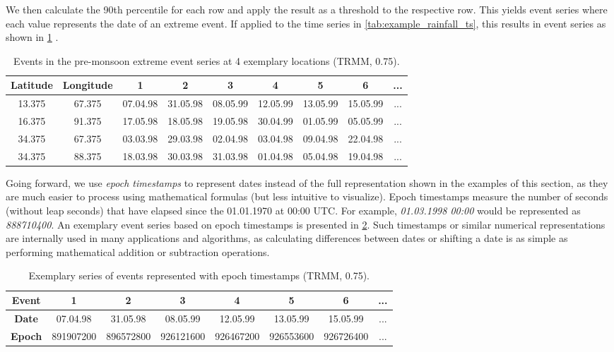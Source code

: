 We then calculate the 90th percentile for each row and apply the result as a threshold to the respective row. This yields event series where each value represents the date of an extreme event. If applied to the time series in \cref{tab:example_rainfall_ts}, this results in event series as shown in \cref{tab:example_rainfall_events} .

\begin{table}[h]
  \centering
  \begin{tabular}{ cc|ccccccc }
    \toprule
    \textbf{Latitude} & \textbf{Longitude} & \textbf{1} & \textbf{2} & \textbf{3} & \textbf{4} & \textbf{5} & \textbf{6} & \textbf{...} \\
    \midrule
    13.375 & 67.375 & 07.04.98 & 31.05.98 & 08.05.99 & 12.05.99 & 13.05.99 & 15.05.99 & ... \\
    16.375 & 91.375 & 17.05.98 & 18.05.98 & 19.05.98 & 30.04.99 & 01.05.99 & 05.05.99 & ... \\
    34.375 & 67.375 & 03.03.98 & 29.03.98 & 02.04.98 & 03.04.98 & 09.04.98 & 22.04.98 & ... \\
    34.375 & 88.375 & 18.03.98 & 30.03.98 & 31.03.98 & 01.04.98 & 05.04.98 & 19.04.98 & ... \\
    \bottomrule
  \end{tabular}
  \caption{Events in the pre-monsoon extreme event series at 4 exemplary locations (TRMM, 0.75\degree).}
  \label{tab:example_rainfall_events}
\end{table}

Going forward, we use \textit{epoch timestamps} to represent dates instead of the full representation shown in the examples of this section, as they are much easier to process using mathematical formulas (but less intuitive to visualize). Epoch timestamps measure the number of seconds (without leap seconds) that have elapsed since the 01.01.1970 at 00:00 UTC. For example, \textit{01.03.1998 00:00} would be represented as \textit{888710400}. An exemplary event series based on epoch timestamps is presented in \cref{tab:example_rainfall_events_unix}. Such timestamps or similar numerical representations are internally used in many applications and algorithms, as calculating differences between dates or shifting a date is as simple as performing mathematical addition or subtraction operations.

\begin{table}[h]
  \centering
  \begin{tabular}{ cccccccc }
    \toprule
    \textbf{Event} & \textbf{1} & \textbf{2} & \textbf{3} & \textbf{4} & \textbf{5} & \textbf{6} & \textbf{...} \\
    \midrule
    \textbf{Date} & 07.04.98 & 31.05.98 & 08.05.99 & 12.05.99 & 13.05.99 & 15.05.99 & ... \\
    \textbf{Epoch} & 891907200 & 896572800 & 926121600 & 926467200 & 926553600 & 926726400 & ... \\
    \bottomrule
  \end{tabular}
  \caption{Exemplary series of events represented with epoch timestamps (TRMM, 0.75\degree).}
  \label{tab:example_rainfall_events_unix}
\end{table}

